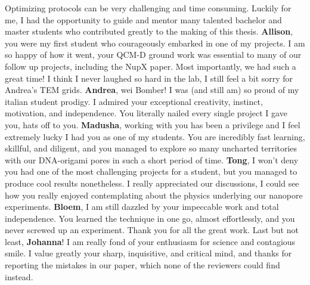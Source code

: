 \noindent Optimizing protocols can be very challenging and time consuming. Luckily for me, I had the opportunity to guide and mentor many talented bachelor and master students who contributed greatly to the making of this thesis. \textbf{Allison}, you were my first student who courageously embarked in one of my projects. I am so happy of how it went, your QCM-D ground work was essential to many of our follow up projects, including the NupX paper. Most importantly, we had such a great time! I think I never laughed so hard in the lab, I still feel a bit sorry for Andrea's TEM grids. \textbf{Andrea}, wei Bomber! I was (and still am) so proud of my italian student prodigy. I admired your exceptional creativity, instinct, motivation, and independence. You literally nailed every single project I gave you, hats off to you. \textbf{Madusha}, working with you has been a privilege and I feel extremely lucky I had you as one of my students. You are incredibly fast learning, skillful, and diligent, and you managed to explore so many uncharted territories with our DNA-origami pores in such a short period of time.  \textbf{Tong}, I won't deny you had one of the most challenging projects for a student, but you managed to produce cool results nonetheless. I really appreciated our discussions, I could see how you really enjoyed contemplating about the physics underlying our nanopore experiments. \textbf{Bloem}, I am still dazzled by your impeccable work and total independence. You learned the technique in one go, almost effortlessly, and you never screwed up an experiment. Thank you for all the great work. Last but not least, \textbf{Johanna}! I am really fond of your enthusiasm for science and contagious smile. I value greatly your sharp, inquisitive, and critical mind, and thanks for reporting the mistakes in our paper, which none of the reviewers could find instead.\\[0.5pt]

